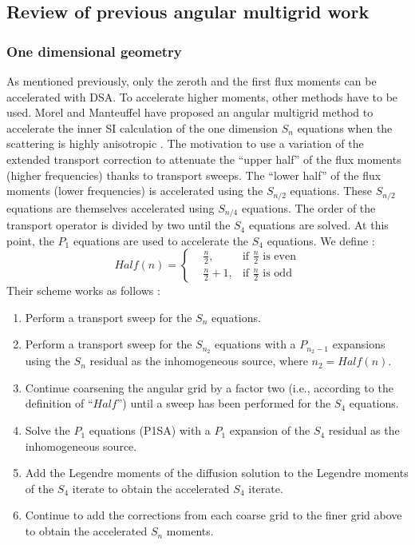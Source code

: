 \subsection{Review of previous angular multigrid work}
\subsubsection{One dimensional geometry}
As mentioned previously, only the zeroth and the first flux moments can be
accelerated with DSA. To accelerate higher moments, other methods have to be
used. Morel and Manteuffel have proposed an angular 
multigrid method to accelerate the inner SI calculation of the one dimension 
$S_n$ equations when the scattering is highly anisotropic 
\cite{multigrid_1d}. The motivation to use a variation of the extended
transport correction \cite{lathrop} to attenuate the ``upper half'' of the
flux moments (higher frequencies) thanks to transport sweeps. The ``lower half'' 
of the flux moments (lower frequencies) is accelerated using the $S_{n/2}$ 
equations. These $S_{n/2}$ equations are themselves 
accelerated using $S_{n/4}$ equations. The order of the transport operator is 
divided by two 
until the $S_4$ equations are solved. At this point, the $P_1$ equations are 
used to accelerate the $S_4$ equations. We define :
\begin{equation}
Half(n) = \left\{
\begin{aligned}
&\frac{n}{2}, &\textrm{if $\frac{n}{2}$ is even}\\
&\frac{n}{2}+1, &\textrm{if $\frac{n}{2}$ is odd}
\end{aligned}
\right.
\end{equation}
Their scheme works as follows : 
\begin{enumerate}
\item Perform a transport sweep for the $S_n$ equations.
\item Perform a transport sweep for the $S_{n_2}$ equations with a $P_{n_2-1}$
expansions using the $S_n$ residual as the inhomogeneous source, where
$n_2=Half(n)$.
\item Continue coarsening the angular grid by a factor two (i.e., according to
the definition of ``$Half$'') until a sweep has been performed for the $S_4$
equations.
\item Solve the $P_1$ equations (P1SA) with a $P_1$ expansion of the $S_4$
residual as the inhomogeneous source.
\item Add the Legendre moments of the diffusion solution to the Legendre
moments of the $S_4$ iterate to obtain the accelerated $S_4$ iterate.
\item Continue to add the corrections from each coarse grid to the finer grid
above to obtain the accelerated $S_n$ moments.
\end{enumerate}
